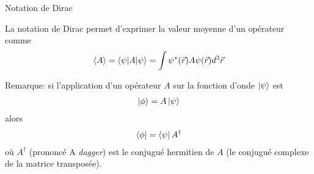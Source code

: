 \documentclass[xcolor=svgnames,t,aspectratio=169,handout]{uqtrcours}
\begin{document}
\begin{frame}{Notation de Dirac}

La notation de Dirac permet d'exprimer la valeur moyenne d'un opérateur comme
\begin{align}
  \braket{A}
  = \braket{\psi \vert A \vert \psi}
  = \int \psi^*(\vec r) A \psi(\vec r) d^3 \vec r
\end{align}

Remarque: si l'application d'un opérateur $A$
  sur la fonction d'onde $\ket{\psi}$ est
\begin{align}
  \ket{\phi} = A \ket{\psi}
\end{align}
alors
\begin{align}
  \bra{\phi} = \bra{\psi} A^{\dagger}
\end{align}
où $A^{\dagger}$ (prononcé A \textit{dagger})
  est le conjugué hermitien de $A$
  (le conjugué complexe de la matrice transposée).

\end{frame}



%
%
\end{document}
